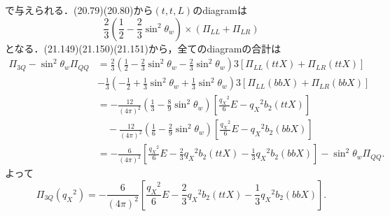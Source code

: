 で与えられる．(20.79)(20.80)から$(t, t, L)$のdiagramは
\[ \frac{2}{3} \left( \frac{1}{2} - \frac{2}{3}\sin^2\theta_w \right) \times (\Pi_{LL} + \Pi_{LR}) \]
となる．(21.149)(21.150)(21.151)から，全てのdiagramの合計は
\begin{align*}
  \Pi_{3Q} - \sin^2\theta_w \Pi_{QQ} &= \frac{2}{3} \left( \frac{1}{2} - \frac{2}{3} \sin^2\theta_w - \frac{2}{3} \sin^2\theta_w \right)
  3[\Pi_{LL}(ttX) + \Pi_{LR}(ttX)] \\
  & -\frac{1}{3} \left( -\frac{1}{2} + \frac{1}{3} \sin^2\theta_w + \frac{1}{3} \sin^2\theta_w \right)
  3[\Pi_{LL}(bbX) + \Pi_{LR}(bbX)] \\
  &= - \frac{12}{(4\pi)^2} \left( \frac{1}{3} - \frac{8}{9}\sin^2\theta_w \right) \left[\frac{q_X{}^2}{6}E - q_X{}^2 b_2(ttX) \right] \\
  &\quad - \frac{12}{(4\pi)^2} \left( \frac{1}{6} - \frac{2}{9}\sin^2\theta_w \right) \left[\frac{q_X{}^2}{6}E - q_X{}^2 b_2(bbX) \right] \\
  &= - \frac{6}{(4\pi)^2} \left[ \frac{q_X{}^2}{6}E - \frac{2}{3} q_X{}^2 b_2(ttX) - \frac{1}{3} q_X{}^2 b_2(bbX) \right] - \sin^2\theta_w \Pi_{QQ} .
\end{align*}
よって
\[ \Pi_{3Q}(q_X{}^2) = - \frac{6}{(4\pi)^2} \left[ \frac{q_X{}^2}{6}E - \frac{2}{3} q_X{}^2 b_2(ttX) - \frac{1}{3} q_X{}^2 b_2(bbX) \right] . \]

